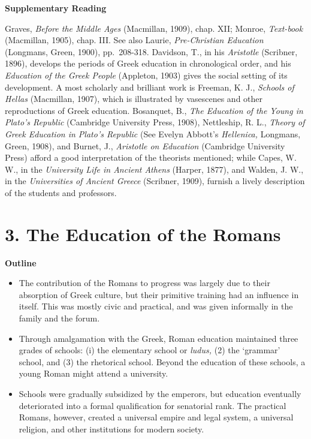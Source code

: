 \documentclass[]{book}
\providecommand{\tightlist}{%
  \setlength{\itemsep}{0pt}\setlength{\parskip}{0pt}}
\begin{document}
\textbf{Supplementary Reading}

Graves, \emph{Before the Middle Ages} (Macmillan, 1909), chap. XII; Monroe, \emph{Text-book} (Macmillan, 1905), chap. III. See also Laurie, \emph{Pre-Christian Education} (Longmans, Green, 1900), pp.~208-318. Davidson, T., in his \emph{Aristotle} (Scribner, 1896), develops the periods of Greek education in chronological order, and his \emph{Education of the Greek People} (Appleton, 1903) gives the social setting of its development. A most scholarly and brilliant work is Freeman, K. J., \emph{Schools of Hellas} (Macmillan, 1907), which is illustrated by vasescenes and other reproductions of Greek education. Bosanquet, B., \emph{The Education of the Young in Plato's Republic} (Cambridge University Press, 1908), Nettleship, R. L., \emph{Theory of Greek Education in Plato's Republic} (See Evelyn Abbott's \emph{Hellenica,} Longmans, Green, 1908), and Burnet, J., \emph{Aristotle on Education} (Cambridge University Press) afford a good interpretation of the theorists mentioned; while Capes, W. W., in the \emph{University Life in Ancient Athens} (Harper, 1877), and Walden, J. W., in the \emph{Universities of Ancient Greece} (Scribner, 1909), furnish a lively description of the students and professors.

\hypertarget{the-education-of-the-romans}{%
\chapter{3. The Education of the Romans}\label{the-education-of-the-romans}}

\textbf{Outline}

\begin{itemize}
\tightlist
\item
  The contribution of the Romans to progress was largely due to their absorption of Greek culture, but their primitive training had an influence in itself. This was mostly civic and practical, and was given informally in the family and the forum.
\item
  Through amalgamation with the Greek, Roman education maintained three grades of schools: (i) the elementary school or \emph{ludus,} (2) the `grammar' school, and (3) the rhetorical school. Beyond the education of these schools, a young Roman might attend a university.
\item
  Schools were gradually subsidized by the emperors, but education eventually deteriorated into a formal qualification for senatorial rank. The practical Romans, however, created a universal empire and legal system, a universal religion, and other institutions for modern society.
\end{itemize}
\end{document}
